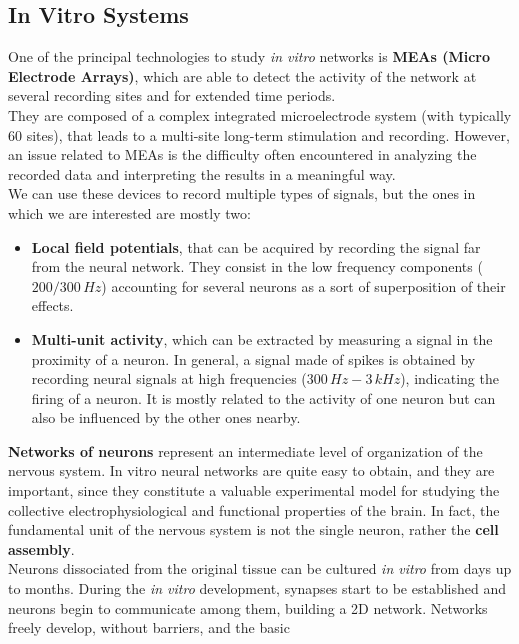 \subsection{In Vitro Systems}
One of the principal technologies to study \textit{in vitro} networks is
\textbf{MEAs (Micro Electrode Arrays)}, which are able to detect the
activity of the network at several recording sites and for extended time
periods.\\
They are composed of a complex integrated microelectrode system (with
typically 60 sites), that leads to a multi-site long-term stimulation and
recording.
However, an issue related to MEAs is the difficulty often encountered in
analyzing the recorded data
and interpreting the results in a meaningful way.\\
We can use these devices to record multiple types of signals, but the ones
in which we are interested are mostly two:
\begin{itemize}
      \item \textbf{Local field potentials}, that can be acquired by
            recording the signal far from the neural network. They consist in the low
            frequency components (\(200/300\,Hz\)) accounting for several neurons as a sort
            of superposition of their effects.
      \item \textbf{Multi-unit activity}, which can be extracted by
            measuring a signal in the proximity of a neuron.  In general, a signal made
            of spikes is obtained by recording neural signals at high frequencies
            (\(300\,Hz-3\,kHz\)), indicating the firing of a neuron. It is mostly related to the
            activity of one neuron but can also be influenced by the other ones
            nearby.
\end{itemize}
\textbf{Networks of neurons} represent an intermediate level of
organization of the nervous system.
In vitro neural networks are quite easy to obtain, and they are important,
since they constitute a valuable experimental model for studying the
collective electrophysiological and functional properties of the brain. In
fact, the fundamental unit of the nervous system is not the single neuron,
rather the \textbf{cell assembly}.\\
Neurons dissociated from the original tissue can be cultured \textit{in vitro} from
days up to months. During the \textit{in vitro} development, synapses start to be
established and neurons begin to communicate among them, building a 2D
network. Networks freely develop, without barriers, and the basic
